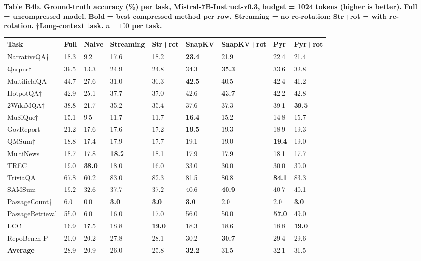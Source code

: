 \documentclass[10pt,letterpaper]{article}
\begin{document}
\textbf{Table B4b. Ground-truth accuracy (\%) per task,
Mistral-7B-Instruct-v0.3, budget = 1024 tokens (higher is better).
Full = uncompressed model. Bold = best compressed method per row.
Streaming = no re-rotation; Str+rot = with re-rotation.
†Long-context task. $n = 100$ per task.}

\begin{table}[H]
\centering
\small
\begin{tabular}{@{}lllllllll@{}}
\toprule
Task & Full & Naive & Streaming & Str+rot & SnapKV & SnapKV+rot & Pyr &
Pyr+rot\\
\midrule
NarrativeQA† & 18.3 & 9.2 & 17.6 & 18.2 & \textbf{23.4} & 21.9 & 22.4 &
21.4\\
Qasper† & 39.5 & 13.3 & 24.9 & 24.8 & 34.3 & \textbf{35.3} & 33.6 &
32.8\\
MultifieldQA & 44.7 & 27.6 & 31.0 & 30.3 & \textbf{42.5} & 40.5 & 42.4 &
41.2\\
HotpotQA† & 42.9 & 25.1 & 37.7 & 37.0 & 42.6 & \textbf{43.7} & 42.2 &
42.8\\
2WikiMQA† & 38.8 & 21.7 & 35.2 & 35.4 & 37.6 & 37.3 & 39.1 &
\textbf{39.5}\\
MuSiQue† & 15.1 & 9.5 & 11.7 & 11.7 & \textbf{16.4} & 15.2 & 14.8 &
15.7\\
GovReport & 21.2 & 17.6 & 17.6 & 17.2 & \textbf{19.5} & 19.3 & 18.9 &
19.3\\
QMSum† & 18.8 & 17.4 & 17.9 & 17.7 & 19.1 & 19.0 & \textbf{19.4} &
19.0\\
MultiNews & 18.7 & 17.8 & \textbf{18.2} & 18.1 & 17.9 & 17.9 & 18.1 &
17.7\\
TREC & 19.0 & \textbf{38.0} & 18.0 & 16.0 & 33.0 & 30.0 & 30.0 &
30.0\\
TriviaQA & 67.8 & 60.2 & 83.0 & 82.3 & 81.5 & 80.8 & \textbf{84.1} &
83.3\\
SAMSum & 19.2 & 32.6 & 37.7 & 37.2 & 40.6 & \textbf{40.9} & 40.7 &
40.1\\
PassageCount† & 6.0 & 0.0 & \textbf{3.0} & \textbf{3.0} & \textbf{3.0} & 2.0 & 2.0 &
\textbf{3.0}\\
PassageRetrieval & 55.0 & 6.0 & 16.0 & 17.0 & 56.0 & 50.0 & \textbf{57.0} &
49.0\\
LCC & 16.9 & 17.5 & 18.8 & \textbf{19.0} & 18.3 & 18.6 & 18.8 &
\textbf{19.0}\\
RepoBench-P & 20.0 & 20.2 & 27.8 & 28.1 & 30.2 & \textbf{30.7} & 29.4 &
29.6\\
\textbf{Average} & 28.9 & 20.9 & 26.0 & 25.8 & \textbf{32.2} & 31.5 & 32.1 &
31.5\\
\bottomrule
\end{tabular}
\end{table}
\end{document}
